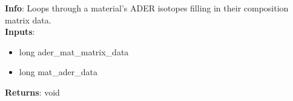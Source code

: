 \textbf{Info}: Loops through a material's ADER isotopes filling in their
composition matrix data. \\

\noindent \textbf{Inputs}:
\begin{itemize}
\item{long ader\_mat\_matrix\_data}
\item{long mat\_ader\_data}
\end{itemize}

\noindent \textbf{Returns}: void
